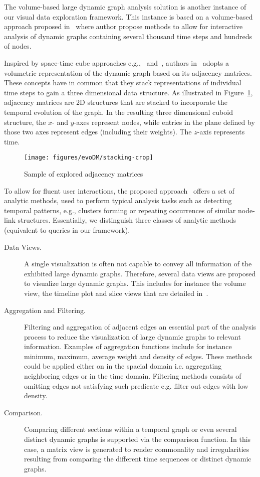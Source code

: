 \label{sec:desc-A02}
The volume-based large dynamic graph analysis solution is another instance of our visual data exploration framework.
This instance is based on a volume-based approach proposed in~\cite{bruder:18} where author propose methods to allow for interactive analysis of dynamic graphs containing several thousand time steps and hundreds of nodes.
	

Inspired by space-time cube approaches e.g.,~\cite{bach:2017} and~\cite{Bach_CHI:14}, authors in~\cite{bruder:18} adopts a volumetric representation of the dynamic graph based on its adjacency matrices.
These concepts have in common that they stack representations of individual time steps to gain a three dimensional data structure.
As illustrated in Figure~\ref{fig:illu}, adjacency matrices are 2D structures that are stacked to incorporate the temporal evolution of the graph.
In the resulting three dimensional cuboid structure, the $x$- and $y$-axes represent nodes, while entries in the plane defined by those two axes represent edges (including their weights). 
The $z$-axis represents time.

\begin{figure}
	\centering
	\texttt{[image: figures/evoDM/stacking-crop]}
	\caption{Sample of explored adjacency matrices~\cite{Bruder2019}}
	\label{fig:illu}
\end{figure}


To allow for fluent user interactions, the proposed approach~\cite{bruder:18} offers a set of analytic methods, used to perform typical analysis tasks such as detecting temporal patterns, e.g., clusters forming or repeating occurrences of similar node-link structures.
Essentially, we distinguish three classes of analytic methods {\color{Fuchsia}(equivalent to queries in our framework)}.

\begin{description}
	\item[Data Views.] 
A single visualization is often not capable to convey all information of the exhibited large dynamic graphs.
Therefore, several data views are proposed to visualize large dynamic graphs.
This includes for instance the volume view, the timeline plot and slice views that are detailed in~\cite{bruder:18}.
	\item[Aggregation and Filtering.] 
Filtering and aggregation of adjacent edges an essential part of the analysis process to reduce the visualization of large dynamic graphs to relevant information.
Examples of aggregation functions include for instance minimum, maximum, average weight and density of edges. These methods could be applied either on in the spacial domain i.e. aggregating neighboring edges or in the time domain.
Filtering methods consists of omitting edges not satisfying such predicate e.g. filter out edges with low density.
\item[Comparison.] 
Comparing different sections within a temporal graph or even several distinct dynamic graphs is supported via the comparison function. 
In this case, a matrix view is generated to render commonality and irregularities resulting from comparing the different time sequences or distinct dynamic graphs.
\end{description}



